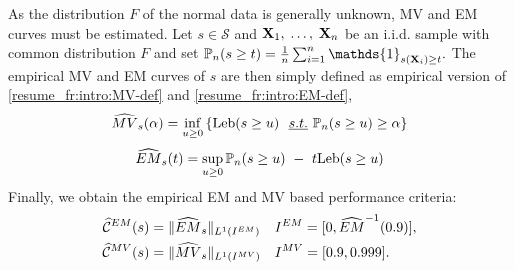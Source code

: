 As the distribution $F$ of the normal data is generally unknown, MV and EM curves must be estimated. Let $s\in \mathcal{S}$ and $\mathbf X_1,\; \ldots,\; \mathbf X_n$ be an i.i.d. sample with common distribution $F$ and set $\mathbb{P}_n(s \ge t)=\frac{1}{n}\sum_{i=1}^n\mathds{1}_{s(\mb X_i)\geq t}.$ The empirical MV and EM curves of $s$ are then simply defined as empirical version of \eqref{resume_fr:intro:MV-def} and \eqref{resume_fr:intro:EM-def}, 
\begin{align}
\label{resume_fr:MV-def-emp}
\widehat{MV}_s(\alpha) = \inf_{u \ge 0} \left\{ \text{Leb}(s \ge u) ~~\emph{s.t.}{}~ \mathbb{P}_n(s \ge u) \ge \alpha \right\}
\end{align}
\begin{align}
\label{resume_fr:EM-def-emp}
\widehat{EM}_s(t) = \sup_{u \ge 0} \mathbb{P}_n(s \ge u) ~-~ t \text{Leb}(s \ge u)
\end{align}
%
%
Finally, we obtain the empirical EM and MV based performance criteria:
\begin{align}
\label{resume_fr:eq:standard_emp_EM}\widehat{\mathcal{C}}^{EM}(s) &= \| \widehat{EM}_s \|_{L^1(I^{EM})}  &&I^{EM} = [0,\widehat{EM}^{-1}(0.9)],\\
\label{resume_fr:eq:standard_emp_MV}\widehat{\mathcal{C}}^{MV}(s) &= \| \widehat{MV}_s \|_{L^1(I^{MV})}  &&I^{MV} = [0.9, 0.999].
\end{align}
%

